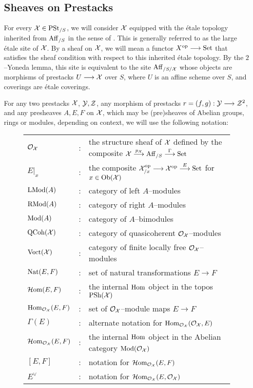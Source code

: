 \documentclass[11pt]{amsart}
\begin{document}
\subsection{Sheaves on Prestacks}

For every $\mathcal{X} \in \mathrm{PSt}_{/S}$, we will consider $\mathcal{X}$ equipped with
the \'etale topology inherited from $\mathrm{Aff}_{/S}$ in the sense of
\cite[\href{https://stacks.math.columbia.edu/tag/06NV}{Definition 06NV}]
{stacks-project}. This is generally referred to as the large \'etale site of
$\mathcal{X}$. By a sheaf on $\mathcal{X}$, we will mean a functor
$X^\op \to \Set$ that satisfies the sheaf condition with respect to this
inherited \'etale topology. By the $2$--Yoneda lemma, this site is equivalent
to the site $\mathrm{Aff}_{/S/\mathcal{X}}$ whose objects are morphisms of prestacks
$U \to \mcX$ over $S$, where $U$ is an affine scheme over $S$,
and coverings are \'etale coverings.

\begin{notn}
For any two prestacks $\mathcal{X}$, $\mathcal{Y}, \mathcal{Z}$, any morphism of prestacks
$r = (f, g) : \mcY \to \mcZ^2$, and any presheaves $A, E, F$ on $\mathcal{X}$, which
may be (pre)sheaves of Abelian groups, rings or modules, depending
on context, we will use the following notation:
\begin{figure}[H]
\begin{tabularx}{\textwidth}{l c l}
$\mathcal{O}_{\mathcal{X}}$ & : & the structure sheaf of $\mathcal{X}$ defined by the composite
  $\mcX \to[p_\mcX] \Aff_{/S} \to[\Gamma] \Set$ \\
$E|_x$ & : & the composite $\mcX_{/x}^\op \to \mcX^\op \to[E] \Set$ for
  $x \in \Ob{\mcX}$ \\
$\mathrm{LMod}(A)$ & : & category of left $A$--modules \\
$\mathrm{RMod}(A)$ & : & category of right $A$--modules \\
$\mathrm{Mod}(A)$ & : & category of $A$--bimodules \\
$\mathrm{QCoh}(\mathcal{X})$ & : & category of quasicoherent $\mathcal{O}_\mathcal{X}$--modules \\
$\mathrm{Vect}(\mathcal{X})$ & : & category of finite locally free $\mathcal{O}_\mathcal{X}$--modules \\
$\mathrm{Nat}(E, F)$ & : & set of natural transformations $E \to F$ \\
$\mathcal{H}\mathrm{om}(E, F)$ & : & the internal $\mathrm{Hom}$ object in the topos $\mathrm{PSh}(\mathcal{X})$ \\
$\mathrm{Hom}_{\mathcal{O}_\mathcal{X}}(E, F)$ & : & set of $\mathcal{O}_\mathcal{X}$--module maps $E \to F$ \\
$\Gamma(E)$ & : & alternate notation for $\mathrm{Hom}_{\mathcal{O}_\mathcal{X}}(\mathcal{O}_\mathcal{X}, E)$ \\
$\mathcal{H}\mathrm{om}_{\mathcal{O}_\mathcal{X}}(E, F)$ & : & the internal $\mathrm{Hom}$ object in the Abelian
  category $\mathrm{Mod}(\mathcal{O}_\mathcal{X})$ \\
$[E, F]$ & : & notation for $\mathcal{H}\mathrm{om}_{\mathcal{O}_\mathcal{X}}(E, F)$ \\
$E^\vee$ & : & notation for $\mathcal{H}\mathrm{om}_{\mathcal{O}_\mathcal{X}}(E, \mathcal{O}_\mathcal{X})$
\end{tabularx}
\end{figure}
\end{notn}
\end{document}
